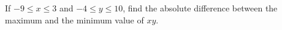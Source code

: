 If $-9\le x\le3$ and $-4\le y\le10$, find the absolute difference between the maximum and the minimum value of $xy$.
